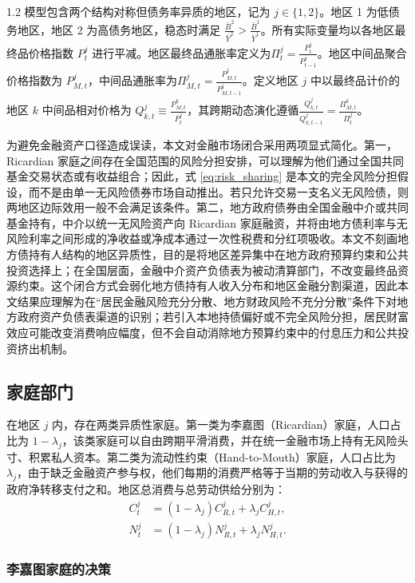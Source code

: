 \documentclass[12pt,UTF8]{ctexart}
\begin{document}
\begin{spacing}{1.2}
		模型包含两个结构对称但债务率异质的地区，记为 $j \in \{1, 2\}$。地区 1 为低债务地区，地区 2 为高债务地区，稳态时满足 $\frac{\bar B^2}{\bar Y^2} > \frac{\bar B^1}{\bar Y^1}$。所有实际变量均以各地区最终品价格指数 $P_t^j$ 进行平减。地区最终品通胀率定义为$\Pi_t^j=\frac{P_t^j}{P_{t-1}^j}$。地区中间品聚合价格指数为 $P_{M,t}^j$，中间品通胀率为$\Pi_{M,t}^j=\frac{P_{M,t}^j}{P_{M,t-1}^j}$。定义地区 $j$ 中以最终品计价的地区 $k$ 中间品相对价格为 $Q_{k,t}^j\equiv \frac{P_{M,t}^k}{P_t^j}$，其跨期动态演化遵循$\frac{Q_{k,t}^j}{Q_{k,t-1}^j}=\frac{\Pi_{M,t}^k}{\Pi_t^j}$。

		为避免金融资产口径造成误读，本文对金融市场闭合采用两项显式简化。第一，Ricardian 家庭之间存在全国范围的风险分担安排，可以理解为他们通过全国共同基金交易状态或有收益组合；因此，式 \eqref{eq:risk_sharing} 是本文的完全风险分担假设，而不是由单一无风险债券市场自动推出。若只允许交易一支名义无风险债，则两地区边际效用一般不会满足该条件。第二，地方政府债券由全国金融中介或共同基金持有，中介以统一无风险资产向 Ricardian 家庭融资，并将由地方债利率与无风险利率之间形成的净收益或净成本通过一次性税费和分红项吸收。本文不刻画地方债持有人结构的地区异质性，目的是将地区差异集中在地方政府预算约束和公共投资选择上；在全国层面，金融中介资产负债表为被动清算部门，不改变最终品资源约束。这个闭合方式会弱化地方债持有人收入分布和地区金融分割渠道，因此本文结果应理解为在“居民金融风险充分分散、地方财政风险不充分分散”条件下对地方政府资产负债表渠道的识别；若引入本地持债偏好或不完全风险分担，居民财富效应可能改变消费响应幅度，但不会自动消除地方预算约束中的付息压力和公共投资挤出机制。
		
		\subsection{家庭部门}
		
		在地区 $j$ 内，存在两类异质性家庭。第一类为李嘉图（Ricardian）家庭，人口占比为 $1-\lambda_j$，该类家庭可以自由跨期平滑消费，并在统一金融市场上持有无风险头寸、积累私人资本。第二类为流动性约束（Hand-to-Mouth）家庭，人口占比为 $\lambda_j$，由于缺乏金融资产参与权，他们每期的消费严格等于当期的劳动收入与获得的政府净转移支付之和。地区总消费与总劳动供给分别为：
		\begin{align}
			C_t^j&=(1-\lambda_j)C_{R,t}^j+\lambda_j C_{H,t}^j, \label{eq:C_agg}\\
			N_t^j&=(1-\lambda_j)N_{R,t}^j+\lambda_j N_{H,t}^j.
			\label{eq:N_agg}
		\end{align}
		
		\subsubsection{李嘉图家庭的决策}
		

\end{spacing}
\end{document}
